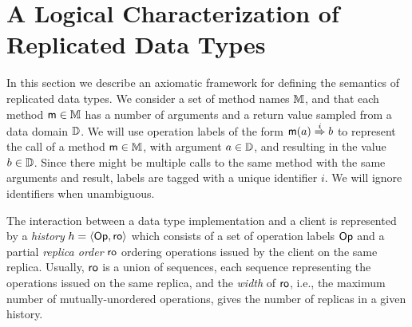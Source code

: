
\section{A Logical Characterization of Replicated Data Types}
\label{sec:consistency}

In this section we describe an axiomatic framework for defining the semantics of replicated data types.
We consider a set of method names $\mathbb{M}$, and that
each method $\mathsf{m} \in \mathbb{M}$ has a number of arguments and a return value sampled from
a data domain $\mathbb{D}$. %
We will use operation labels of the form
$\mathsf{m}(a) \overset{i}{\Rightarrow} b$ to represent the call of a
method $\mathsf{m} \in \mathbb{M}$, with
argument $a \in \mathbb{D}$, and resulting in the value $b \in
\mathbb{D}$. Since there might be multiple calls to the same method with the same
arguments and result, labels are tagged with a unique identifier $i$. We will ignore identifiers when unambiguous.

The interaction between a data type implementation and a client is represented by a \emph{history} ${h}={\left\langle{\mathsf{Op}, \mathsf{ro}}\right\rangle}$ which consists of a set of operation labels $\mathsf{Op}$ and a partial \emph{replica order} $\mathsf{ro}$ ordering operations issued by the client on the same replica. Usually, $\mathsf{ro}$ is a union of sequences, each sequence representing the operations issued on the same replica, and the \emph{width} of $\mathsf{ro}$, i.e., the maximum number of mutually-unordered operations, gives the number of replicas in a given history.

